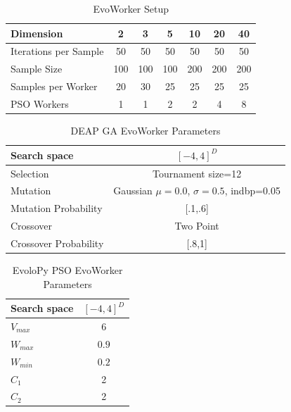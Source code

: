 \begin{table}
  \small
  \caption{EvoWorker Setup}
  \label{tab:params} 
  \centering
  \small
  \begin{tabular}{|l|c|c|c|c|c|c|}
    \hline
    Dimension & 2 & 3 & 5 & 10 & 20 & 40\\ \hline
    Iterations per Sample  & 50 & 50 & 50 & 50 & 50 & 50\\ \hline
    Sample Size  & 100 & 100 & 100 & 200 & 200 & 200 \\ \hline
    Samples per Worker & 20 & 30 & 25 & 25 & 25 & 25  \\ \hline
    PSO Workers & 1 & 1 & 2 & 2 & 4 & 8  \\ \hline
  \end{tabular}
\end{table}



\begin{table}
  \small
  \caption{ DEAP GA EvoWorker Parameters }
  \label{tab:DEAP:GAparams} 
  \centering
  \small
  \begin{tabular}{|l|c|}
    \hline
    Search space &  $[-4,4]^{D}$ \\ \hline
    Selection & Tournament size=12\\ \hline
    Mutation & Gaussian $\mu=0.0$, $\sigma=0.5$, indbp=0.05  \\ \hline
    Mutation Probability & [.1,.6]  \\ \hline
    Crossover & Two Point  \\ \hline
    Crossover Probability& [.8,1]  \\ \hline
  \end{tabular}
\end{table}

\begin{table}
  \small
  \caption{ EvoloPy PSO EvoWorker Parameters }
  \label{tab:PSOparams} 
  \centering
  \small
  \begin{tabular}{|l|c|}
    \hline
    Search space &  $[-4,4]^{D}$ \\ \hline
    $V_{max}$ & 6 \\ \hline
    $W_{max}$ & $0.9$ \\ \hline
    $W_{min}$ & $0.2$ \\ \hline
    $C_1$ & 2 \\ \hline
    $C_2$ & 2 \\ \hline
  \end{tabular}
\end{table}


